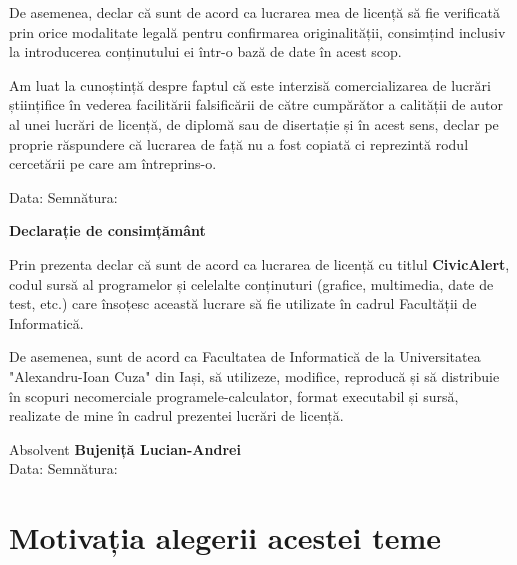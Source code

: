 \documentclass[12pt,a4paper]{report}
\begin{document}
De asemenea, declar că sunt de acord ca lucrarea mea de licență să fie verificată prin orice modalitate legală pentru confirmarea originalității, consimțind inclusiv la introducerea conținutului ei într-o bază de date în acest scop.

Am luat la cunoștință despre faptul că este interzisă comercializarea de lucrări științifice în vederea facilitării falsificării de către cumpărător a calității de autor al unei lucrări de licență, de diplomă sau de disertație și în acest sens, declar pe proprie răspundere că lucrarea de față nu a fost copiată ci reprezintă rodul cercetării pe care am întreprins-o.

\begin{flushright}
    Data: \dotfill \hspace{6cm} Semnătura: \dotfill
\end{flushright}

\vspace*{\fill}

\newpage
\thispagestyle{empty}
\vspace*{\fill}
\begin{center}
    \large
    \textbf{Declarație de consimțământ}
\end{center}

Prin prezenta declar că sunt de acord ca lucrarea de licență cu titlul \textbf{CivicAlert}, codul sursă al programelor și celelalte conținuturi (grafice, multimedia, date de test, etc.) care însoțesc această lucrare să fie utilizate în cadrul Facultății de Informatică.

De asemenea, sunt de acord ca Facultatea de Informatică \space de la Universitatea "Alexandru-Ioan Cuza" din Iași, să utilizeze, modifice, reproducă și să distribuie în scopuri necomerciale programele-calculator, format executabil și sursă, realizate de mine în cadrul prezentei lucrări de licență.

\begin{flushright}
    Absolvent \textbf{Bujeniță Lucian-Andrei} \\
    \vspace{0.5cm}
    Data: \dotfill \hspace{6cm} Semnătura: \dotfill
\end{flushright}
\vspace*{\fill}



\newpage
\setcounter{page}{1} 
\tableofcontents
\newpage
\section*{Motivația alegerii acestei teme}
\end{document}
